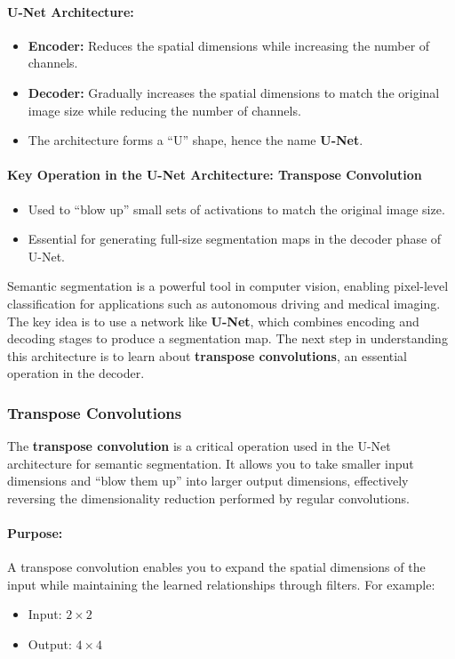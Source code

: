 \documentclass[letterpaper,12pt,notitlepage,twoside]{report}
\begin{document}
\paragraph{U-Net Architecture:}
\begin{itemize}
    \item \textbf{Encoder:} Reduces the spatial dimensions while increasing the number of channels.
    \item \textbf{Decoder:} Gradually increases the spatial dimensions to match the original image size while reducing the number of channels.
    \item The architecture forms a ``U'' shape, hence the name \textbf{U-Net}.
\end{itemize}

\paragraph{Key Operation in the U-Net Architecture: Transpose Convolution}
\begin{itemize}
    \item Used to ``blow up'' small sets of activations to match the original image size.
    \item Essential for generating full-size segmentation maps in the decoder phase of U-Net.
\end{itemize}

Semantic segmentation is a powerful tool in computer vision, enabling pixel-level classification for applications such as autonomous driving and medical imaging. The key idea is to use a network like \textbf{U-Net}, which combines encoding and decoding stages to produce a segmentation map. The next step in understanding this architecture is to learn about \textbf{transpose convolutions}, an essential operation in the decoder. 

\subsubsection*{Transpose Convolutions}
The \textbf{transpose convolution} is a critical operation used in the U-Net architecture for semantic segmentation. It allows you to take smaller input dimensions and ``blow them up'' into larger output dimensions, effectively reversing the dimensionality reduction performed by regular convolutions.

\paragraph{Purpose:} A transpose convolution enables you to expand the spatial dimensions of the input while maintaining the learned relationships through filters. For example:
\begin{itemize}
    \item Input: $2 \times 2$
    \item Output: $4 \times 4$
\end{itemize}
\end{document}
